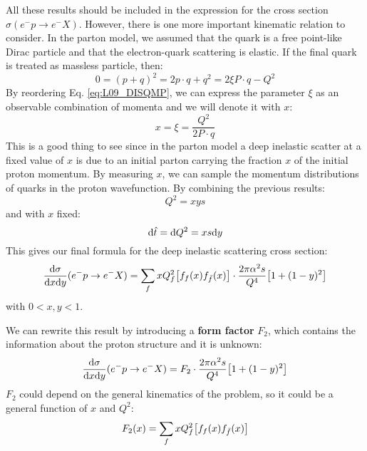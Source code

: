 \documentclass[../../main/main.tex]{subfiles}
\begin{document}
All these results should be included in the expression for the cross section \( \sigma(e^-p \longrightarrow e^-X) \). However, there is one more important kinematic relation to consider. In the parton model, we assumed that the quark is a free point-like Dirac particle and that the electron-quark scattering is elastic. If the final quark is treated as massless particle, then:
\begin{equation}
	0
	=
	(p + q)^2
	=
	2p \cdot q + q^2
	=
	2\xi P \cdot q - Q^2
	\label{eq:L09_DISQMP}
\end{equation}
By reordering Eq. \ref{eq:L09_DISQMP}, we can express the parameter \( \xi \) as an observable combination of momenta and we will denote it with \( x \):
\begin{equation}
	x
	=
	\xi
	=
	\frac{Q^2}{2P \cdot q}
	\label{eq:L09_DISXD}
\end{equation}
This is a good thing to see since in the parton model a deep inelastic scatter at a fixed value of \( x \) is due to an initial parton carrying the fraction \( x \) of the initial proton momentum. By measuring \( x \), we can sample the momentum distributions of quarks in the proton wavefunction. By combining the previous results:
\begin{equation}
	Q^2
	=
	xys
	\label{eq:L09_DISQXYS}
\end{equation}
and with \( x \) fixed:
\begin{equation}
	\mathrm{d}{\hat{t}}
	=
	\mathrm{d}{Q^2}
	=
	xs \mathrm{d}{y}
	\label{eq:L09_DISQXYS_2}
\end{equation}
This gives our final formula for the deep inelastic scattering cross section:
\begin{equation}
	\frac{\mathrm{d}{\sigma}}{\mathrm{d}{x}\mathrm{d}{y}}(e^-p \rightarrow e^-X)
	=
	\sum_{f} x Q^2_f \qty[f_f(x) f_{\bar{f}}(x)] \cdot \frac{2\pi \alpha^2 s}{Q^4} \qty[1 + (1-y)^2]
	\label{eq:L09_DISCSXY}
\end{equation}
with \( 0 < x,y < 1 \).

We can rewrite this result by introducing a \textbf{form factor} \( F_2 \), which contains the information about the proton structure and it is unknown:
\begin{equation}
	\frac{\mathrm{d}{\sigma}}{\mathrm{d}{x}\mathrm{d}{y}}(e^-p \rightarrow e^-X)
	=
	F_2 \cdot \frac{2\pi \alpha^2 s}{Q^4} \qty[1 + (1-y)^2]
	\label{eq:L09_DISCSFF}
\end{equation}
\( F_2 \) could depend on the general kinematics of the problem, so it could be a general function of \( x \) and \( Q^2 \):
\begin{equation}
	F_2(x)
	=
	\sum_{f} x Q^2_f \qty[f_f(x) f_{\bar{f}}(x)]
	\label{eq:L09_DISFFD}
\end{equation}
\end{document}
